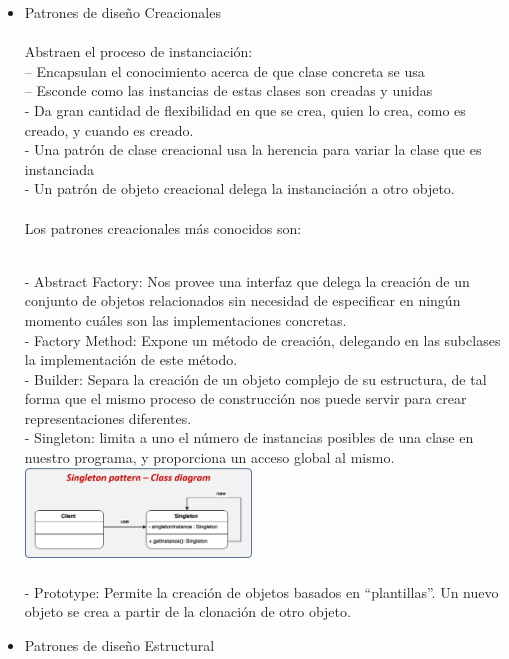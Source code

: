 \documentclass[twoside,twocolumn]{article}
\begin{document}
\begin{itemize}
	\item Patrones de diseño Creacionales\\
	
 \\Abstraen el proceso de instanciación:
\\– Encapsulan el conocimiento acerca de que clase
concreta se usa
\\– Esconde como las instancias de estas clases son
creadas y unidas
\\- Da gran cantidad de flexibilidad en que se crea,
quien lo crea, como es creado, y cuando es
creado.
\\- Una patrón de clase creacional usa la herencia
para variar la clase que es instanciada
\\- Un patrón de objeto creacional delega la
instanciación a otro objeto.
\\\\Los patrones creacionales más conocidos son:

\\- Abstract Factory: Nos provee una interfaz que delega la creación de un conjunto de objetos relacionados sin necesidad de especificar en ningún momento cuáles son las implementaciones concretas.
\\- Factory Method: Expone un método de creación,  delegando en las subclases la implementación de este método.
\\- Builder: Separa la creación de un objeto complejo de su estructura, de tal forma que el mismo proceso de construcción nos puede servir para crear representaciones diferentes.
\\- Singleton: limita a uno el número de instancias posibles de una clase en nuestro programa, y proporciona un acceso global al mismo.
	\includegraphics[width=6cm]{./imagenes/creacion.png}\\
	
\\- Prototype: Permite la creación de objetos basados en “plantillas”. Un nuevo objeto se crea a partir de la clonación de otro objeto.

	\item Patrones de diseño Estructural


\end{itemize}
\end{document}
